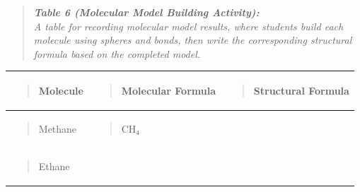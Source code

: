 \documentclass[
  letterpaper,
  DIV=11,
  numbers=noendperiod]{scrreprt}
\newcounter{none} %
\begin{document}
\begin{quote}
\emph{\textbf{Table 6 (Molecular Model Building Activity):}\\
A table for recording molecular model results, where students build each
molecule using spheres and bonds, then write the corresponding
structural formula based on the completed model.}
\end{quote}

{\def\LTcaptype{none} %
\begin{longtable}[]{@{}
  >{\raggedright\arraybackslash}p{}
  >{\raggedright\arraybackslash}p{}
  >{\raggedright\arraybackslash}p{}@{}}
\toprule\noalign{}
\begin{minipage}[b]{\linewidth}\raggedright
\begin{quote}
\textbf{Molecule}
\end{quote}
\end{minipage} & \begin{minipage}[b]{\linewidth}\raggedright
\begin{quote}
\textbf{Molecular Formula}
\end{quote}
\end{minipage} & \begin{minipage}[b]{\linewidth}\raggedright
\begin{quote}
\textbf{Structural Formula}
\end{quote}
\end{minipage} \\
\midrule\noalign{}
\endhead
\bottomrule\noalign{}
\endlastfoot
\begin{minipage}[t]{\linewidth}\raggedright
\begin{quote}
Methane
\end{quote}
\end{minipage} & \begin{minipage}[t]{\linewidth}\raggedright
\begin{quote}
CH₄
\end{quote}
\end{minipage} & \\
\begin{minipage}[t]{\linewidth}\raggedright
\begin{quote}
Ethane
\end{quote}
\end{minipage} & \begin{minipage}[t]{\linewidth}\raggedright

\end{minipage}
\end{longtable}}
\end{document}
